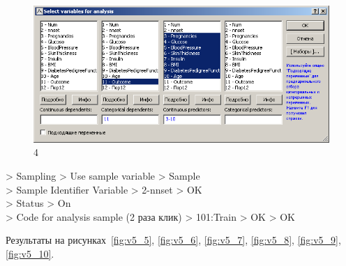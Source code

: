 \begin{figure}[!h]
  \centering

  \includegraphics[width=12cm]
  {inc/v5_4.PNG}

  \caption{4}

  \label{fig:v5_4}
\end{figure}

> Sampling > Use sample variable > Sample \\
> Sample Identifier Variable > 2-nnset > OK \\
> Status > On \\
> Code for analysis sample (2 раза клик) > 101:Train > OK > OK

Результаты на рисунках~\ref{fig:v5_5}, \ref{fig:v5_6}, \ref{fig:v5_7},
\ref{fig:v5_8}, \ref{fig:v5_9}, \ref{fig:v5_10}.

